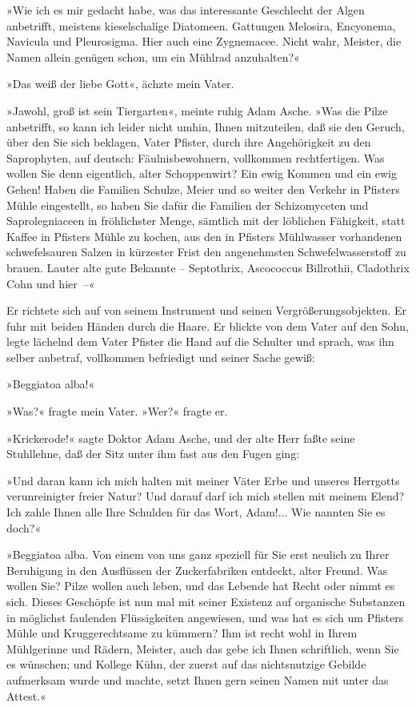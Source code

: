 »Wie ich es mir gedacht habe, was das interessante Geschlecht der
Algen anbetrifft, meistens kieselschalige Diatomeen. Gattungen
Melosira, Encyonema, Navicula und Pleurosigma. Hier auch eine
Zygnemacee. Nicht wahr, Meister, die Namen allein genügen schon, um
ein Mühlrad anzuhalten?«

»Das weiß der liebe Gott«, ächzte mein Vater.

»Jawohl, groß ist sein Tiergarten«, meinte ruhig Adam Asche. »Was
die Pilze anbetrifft, so kann ich leider nicht umhin, Ihnen
mitzuteilen, daß sie den Geruch, über den Sie sich beklagen, Vater
Pfister, durch ihre Angehörigkeit zu den Saprophyten, auf deutsch:
Fäulnisbewohnern, vollkommen rechtfertigen. Was wollen Sie denn
eigentlich, alter Schoppenwirt? Ein ewig Kommen und ein ewig Gehen!
Haben die Familien Schulze, Meier und so weiter den Verkehr in
Pfisters Mühle eingestellt, so haben Sie dafür die Familien der
Schizomyceten und Saprolegniaceen in fröhlichster Menge, sämtlich
mit der löblichen Fähigkeit, statt Kaffee in Pfisters Mühle zu
kochen, aus den in Pfisters Mühlwasser vorhandenen schwefelsauren
Salzen in kürzester Frist den angenehmsten Schwefelwasserstoff zu
brauen. Lauter alte gute Bekannte – Septothrix, Ascococcus
Billrothii, Cladothrix Cohn und hier~–«

Er richtete sich auf von seinem Instrument und seinen
Vergrößerungsobjekten. Er fuhr mit beiden Händen durch die Haare.
Er blickte von dem Vater auf den Sohn, legte lächelnd dem Vater
Pfister die Hand auf die Schulter und sprach, was ihn selber
anbetraf, vollkommen befriedigt und seiner Sache gewiß:

»Beggiatoa alba!«

»Was?« fragte mein Vater. »Wer?« fragte er.

»Krickerode!« sagte Doktor Adam Asche, und der alte Herr faßte
seine Stuhllehne, daß der Sitz unter ihm fast aus den Fugen ging:

»Und daran kann ich mich halten mit meiner Väter Erbe und unseres
Herrgotts verunreinigter freier Natur? Und darauf darf ich mich
stellen mit meinem Elend? Ich zahle Ihnen alle Ihre Schulden für
das Wort, Adam!... Wie nannten Sie es doch?«

»Beggiatoa alba. Von einem von uns ganz speziell für Sie erst
neulich zu Ihrer Beruhigung in den Ausflüssen der Zuckerfabriken
entdeckt, alter Freund. Was wollen Sie? Pilze wollen auch leben,
und das Lebende hat Recht oder nimmt es sich. Dieses Geschöpfe ist
nun mal mit seiner Existenz auf organische Substanzen in möglichst
faulenden Flüssigkeiten angewiesen, und was hat es sich um Pfisters
Mühle und Kruggerechtsame zu kümmern? Ihm ist recht wohl in Ihrem
Mühlgerinne und Rädern, Meister, auch das gebe ich Ihnen
schriftlich, wenn Sie es wünschen; und Kollege Kühn, der zuerst auf
das nichtsnutzige Gebilde aufmerksam wurde und machte, setzt Ihnen
gern seinen Namen mit unter das Attest.«

